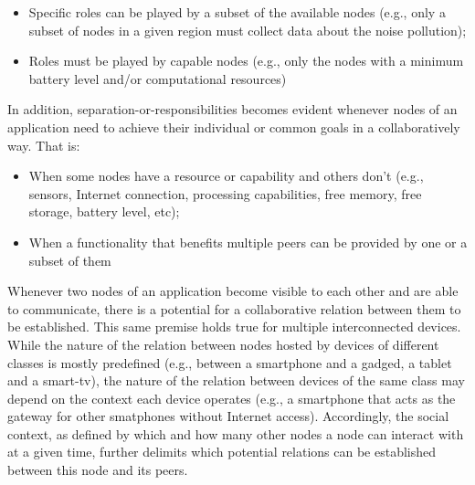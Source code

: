 \begin{itemize}
	\item Specific roles can be played by a subset of the available nodes (e.g., only a subset of nodes in a given region must collect data about the noise pollution);
	
	\item Roles must be played by capable nodes (e.g., only the nodes with a minimum battery level and/or computational resources)
\end{itemize}


In addition, separation-or-responsibilities becomes evident whenever nodes of an application need to achieve their individual or common goals in a collaboratively way. That is:

\begin{itemize}
	
	\item When some nodes have a resource or capability and others don't (e.g., sensors, Internet connection, processing capabilities, free memory, free storage, battery level, etc);
	
	\item When a functionality that benefits multiple peers can be provided by one or a subset of them

\end{itemize}


Whenever two nodes of an application become visible to each other and are able to communicate, there is a potential for a collaborative relation between them to be established. 
This same premise holds true for multiple interconnected devices. 
While the nature of the relation between nodes hosted by devices of different classes is mostly predefined (e.g., between a smartphone and a gadged, a tablet and a smart-tv), the nature of the relation between devices of the same class may depend on the context each device operates (e.g., a smartphone that acts as the gateway for other smatphones without Internet access). 
Accordingly, the social context, as defined by which and how many other nodes a node can interact with at a given time, further delimits which potential relations can be established between this node and its peers. 


